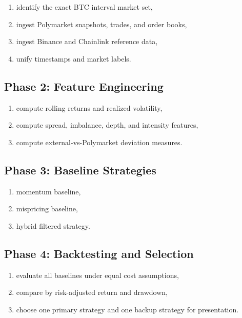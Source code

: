 \documentclass[11pt, letterpaper]{article}
\begin{document}
\begin{enumerate}[nosep]
    \item identify the exact BTC interval market set,
    \item ingest Polymarket snapshots, trades, and order books,
    \item ingest Binance and Chainlink reference data,
    \item unify timestamps and market labels.
\end{enumerate}

\subsection{Phase 2: Feature Engineering}

\begin{enumerate}[nosep]
    \item compute rolling returns and realized volatility,
    \item compute spread, imbalance, depth, and intensity features,
    \item compute external-vs-Polymarket deviation measures.
\end{enumerate}

\subsection{Phase 3: Baseline Strategies}

\begin{enumerate}[nosep]
    \item momentum baseline,
    \item mispricing baseline,
    \item hybrid filtered strategy.
\end{enumerate}

\subsection{Phase 4: Backtesting and Selection}

\begin{enumerate}[nosep]
    \item evaluate all baselines under equal cost assumptions,
    \item compare by risk-adjusted return and drawdown,
    \item choose one primary strategy and one backup strategy for presentation.
\end{enumerate}
\end{document}
